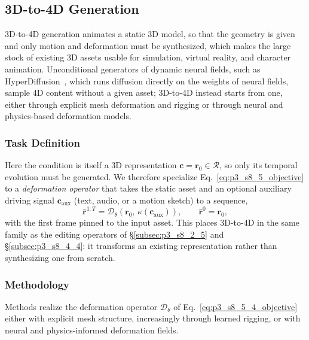 
\subsection{3D-to-4D Generation}
\label{subsec:p3_s8_5_4}
3D-to-4D generation animates a static 3D model, so that the geometry is given and only motion and deformation must be synthesized, which makes the large stock of existing 3D assets usable for simulation, virtual reality, and character animation.
Unconditional generators of dynamic neural fields, such as HyperDiffusion~\cite{erkocc2023hyperdiffusion}, which runs diffusion directly on the weights of neural fields, sample 4D content without a given asset; 3D-to-4D instead starts from one, either through explicit mesh deformation and rigging or through neural and physics-based deformation models.

\subsubsection{Task Definition}
\label{subsubsec:p3_s8_5_4_task}
Here the condition is itself a 3D representation $\mathbf{c}=\mathbf{r}_0\in\mathcal{R}$, so only its temporal evolution must be generated. We therefore specialize Eq.~\eqref{eq:p3_s8_5_objective} to a \emph{deformation operator} that takes the static asset and an optional auxiliary driving signal $\mathbf{c}_{\text{aux}}$ (text, audio, or a motion sketch) to a sequence,
\begin{equation}
\label{eq:p3_s8_5_4_objective}
\hat{\mathbf{r}}^{1:T}=\mathcal{D}_\theta\!\left(\mathbf{r}_0,\,\kappa(\mathbf{c}_{\text{aux}})\right),\qquad \hat{\mathbf{r}}^{0}=\mathbf{r}_0,
\end{equation}
with the first frame pinned to the input asset. This places 3D-to-4D in the same family as the editing operators of §\ref{subsec:p3_s8_2_5} and §\ref{subsec:p3_s8_4_4}: it transforms an existing representation rather than synthesizing one from scratch.

\subsubsection{Methodology}
\label{subsubsec:p3_s8_5_4_method}
Methods realize the deformation operator $\mathcal{D}_\theta$ of Eq.~\eqref{eq:p3_s8_5_4_objective} either with explicit mesh structure, increasingly through learned rigging, or with neural and physics-informed deformation fields.

